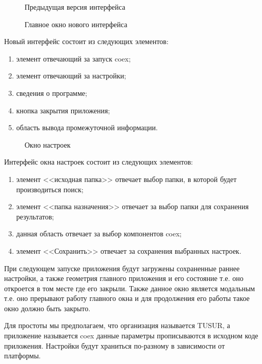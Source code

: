 

\begin{figure}[h!]
\caption{ Предыдущая версия интерфейса }
\label{ship_1:ship_1}
\end{figure}

\begin{figure}[h!]
\caption{ Главное окно нового интерфейса }
\label{ship_2:ship_2}
\end{figure}

Новый интерфейс состоит из следующих элементов:
\begin{enumerate}
  \item элемент отвечающий за запуск coex;
  \item элемент отвечающий за настройки;
  \item сведения о программе;
  \item кнопка закрытия приложения;
  \item область вывода промежуточной информации.
\end{enumerate}

\begin{figure}[h!]
\caption{ Окно настроек }
\label{ship_3:ship_3}
\end{figure}

Интерфейс окна настроек состоит из следующих элементов:
\begin{enumerate}
  \item элемент <<исходная папка>> отвечает выбор папки, в которой будет производиться поиск;
  \item элемент <<папка назначения>> отвечает за выбор папки для сохранения результатов;
  \item данная область отвечает за выбор компонентов coex;
  \item элемент <<Сохранить>> отвечает за сохранения выбранных настроек.
\end{enumerate}

При следующем запуске приложения будут загружены сохраненные раннее настройки, а также геометрия главного приложения и его состояние т.е. оно откроется в том месте где его закрыли. Также данное окно является модальным т.е. оно прерывают работу главного окна и для продолжения его работы такое окно должно быть закрыто.

Для простоты мы предполагаем, что организация называется TUSUR, а приложение называется coex данные параметры прописываются в исходном коде приложения. Настройки будут храниться по-разному в зависимости от платформы.

